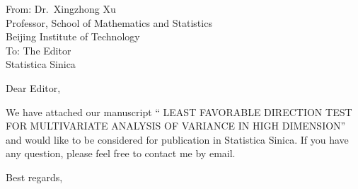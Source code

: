 \documentclass[11pt]{letter} %
\begin{document}
    \begin{letter}{From: Dr.\  Xingzhong Xu\\
        Professor, School of Mathematics and Statistics\\
        Beijing Institute of Technology\\
        \vspace{10pt}
        To: The  Editor\\
        Statistica Sinica} 



        \signature{Xingzhong Xu\\
        Email address: xuxz@bit.edu.cn}


\opening{Dear Editor,}
We have attached our manuscript `` LEAST FAVORABLE DIRECTION TEST FOR MULTIVARIATE ANALYSIS OF VARIANCE IN HIGH DIMENSION'' and would like to be considered for publication in Statistica Sinica. If you have any question, please feel free to contact me by email.
\closing{Best regards,}
\end{letter}
\end{document}
